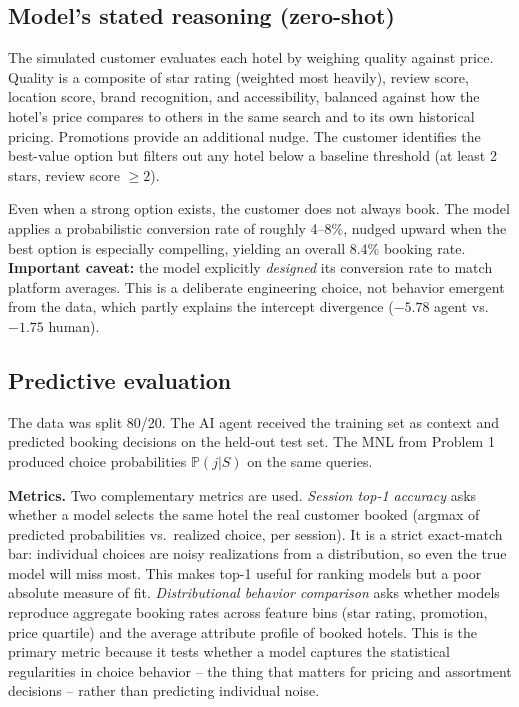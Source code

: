 \documentclass[11pt]{article}
\begin{document}
\subsection*{Model's stated reasoning (zero-shot)}

The simulated customer evaluates each hotel by weighing quality against price. Quality is a composite of star rating (weighted most heavily), review score, location score, brand recognition, and accessibility, balanced against how the hotel's price compares to others in the same search and to its own historical pricing. Promotions provide an additional nudge. The customer identifies the best-value option but filters out any hotel below a baseline threshold (at least 2 stars, review score $\geq 2$).

Even when a strong option exists, the customer does not always book. The model applies a probabilistic conversion rate of roughly 4--8\%, nudged upward when the best option is especially compelling, yielding an overall 8.4\% booking rate. \textbf{Important caveat:} the model explicitly \textit{designed} its conversion rate to match platform averages. This is a deliberate engineering choice, not behavior emergent from the data, which partly explains the intercept divergence ($-5.78$ agent vs.\ $-1.75$ human).

\subsection*{Predictive evaluation}

The data was split 80/20. The AI agent received the training set as context and predicted booking decisions on the held-out test set. The MNL from Problem 1 produced choice probabilities $\mathbb{P}(j|S)$ on the same queries.

\textbf{Metrics.} Two complementary metrics are used. \textit{Session top-1 accuracy} asks whether a model selects the same hotel the real customer booked (argmax of predicted probabilities vs.\ realized choice, per session). It is a strict exact-match bar: individual choices are noisy realizations from a distribution, so even the true model will miss most. This makes top-1 useful for ranking models but a poor absolute measure of fit. \textit{Distributional behavior comparison} asks whether models reproduce aggregate booking rates across feature bins (star rating, promotion, price quartile) and the average attribute profile of booked hotels. This is the primary metric because it tests whether a model captures the statistical regularities in choice behavior -- the thing that matters for pricing and assortment decisions -- rather than predicting individual noise.
\end{document}
